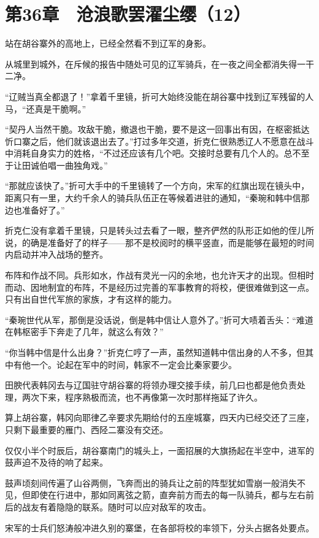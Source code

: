 \section{第36章　沧浪歌罢濯尘缨（12）}

站在胡谷寨外的高地上，已经全然看不到辽军的身影。

从城里到城外，在斥候的报告中随处可见的辽军骑兵，在一夜之间全都消失得一干二净。

“辽贼当真全都退了！”拿着千里镜，折可大始终没能在胡谷寨中找到辽军残留的人马，“还真是干脆啊。”

“契丹人当然干脆。攻敌干脆，撤退也干脆，要不是这一回事出有因，在枢密抵达忻口寨之后，他们就该退出去了。”打过多年交道，折克仁很熟悉辽人不愿意在战斗中消耗自身实力的姓格，“不过还应该有几个吧。交接时总要有几个人的。总不至于让田诚伯唱一曲独角戏。”

“那就应该快了。”折可大手中的千里镜转了一个方向，宋军的红旗出现在镜头中，距离只有一里，大约千余人的骑兵队伍正在等候着进驻的通知，“秦琬和韩中信那边也准备好了。”

折克仁没有拿着千里镜，只是转头过去看了一眼，整齐俨然的队形正如他的侄儿所说，的确是准备好了的样子——那不是校阅时的横平竖直，而是能够在最短的时间内启动并冲入战场的整齐。

布阵和作战不同。兵形如水，作战有灵光一闪的余地，也允许天才的出现。但相时而动、因地制宜的布阵，不是经历过完善的军事教育的将校，便很难做到这一点。只有出自世代军旅的家族，才有这样的能力。

“秦琬世代从军，那倒是没话说，倒是韩中信让人意外了。”折可大啧着舌头：“难道在韩枢密手下奔走了几年，就这么有效？”

“你当韩中信是什么出身？”折克仁哼了一声，虽然知道韩中信出身的人不多，但其中有他一个。论起在军中的时间，韩家不一定会比秦家要少。

田腴代表韩冈去与辽国驻守胡谷寨的将领办理交接手续，前几曰也都是他负责处理，两次下来，程序熟极而流，也不再像第一次时那样拖延了许久。

算上胡谷寨，韩冈向耶律乙辛要求先期给付的五座城寨，四天内已经交还了三座，只剩下最重要的雁门、西陉二寨没有交还。

仅仅小半个时辰后，胡谷寨南门的城头上，一面招展的大旗扬起在半空中，进军的鼓声迫不及待的响了起来。

鼓声顷刻间传遍了山谷两侧，飞奔而出的骑兵让之前的阵型犹如雪崩一般消失不见，但即使在行进中，那如同离弦之箭，直奔前方而去的每一队骑兵，都与左右前后的战友有着隐隐的联系。随时可以应对敌军的攻击。

宋军的士兵们怒涛般冲进久别的寨堡，在各部将校的率领下，分头占据各处要点。

